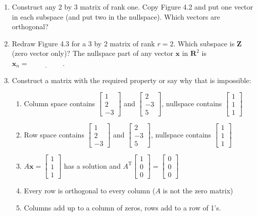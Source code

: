\documentclass[14pt, a4paper]{article}
\begin{document}
\begin{enumerate}
    \item Construct any 2 by 3 matrix of rank one. Copy Figure 4.2 and put one vector in each subspace (and put two in the nullspace). Which vectors are orthogonal?

    \item Redraw Figure 4.3 for a 3 by 2 matrix of rank $r=2$. Which subspace is $\mathbf{Z}$ (zero vector only)? The nullspace part of any vector $\boldsymbol{x}$ in $\mathbf{R}^2$ is $\boldsymbol{x}_n = \underline{\hspace{2cm}}$.

    \item Construct a matrix with the required property or say why that is impossible:
          \begin{enumerate}
              \item Column space contains $\begin{bmatrix} 1 \\ 2 \\ -3 \end{bmatrix}$ and $\begin{bmatrix} 2 \\ -3 \\ 5 \end{bmatrix}$, nullspace contains $\begin{bmatrix} 1 \\ 1 \\ 1 \end{bmatrix}$
              \item Row space contains $\begin{bmatrix} 1 \\ 2 \\ -3 \end{bmatrix}$ and $\begin{bmatrix} 2 \\ -3 \\ 5 \end{bmatrix}$, nullspace contains $\begin{bmatrix} 1 \\ 1 \\ 1 \end{bmatrix}$
              \item $A\boldsymbol{x} = \begin{bmatrix} 1 \\ 1 \\ 1 \end{bmatrix}$ has a solution and $A^{\mathrm{T}}\begin{bmatrix} 1 \\ 0 \\ 0 \end{bmatrix} = \begin{bmatrix} 0 \\ 0 \\ 0 \end{bmatrix}$
              \item Every row is orthogonal to every column ($A$ is not the zero matrix)
              \item Columns add up to a column of zeros, rows add to a row of 1's.
          \end{enumerate}


\end{enumerate}
\end{document}
